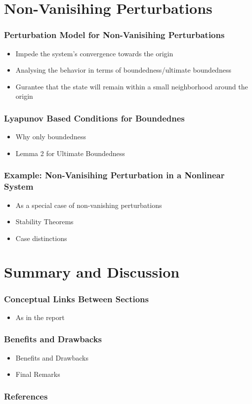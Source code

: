 \documentclass[student, noshadow, lsr, english, aspectratio=169, t]{ITR_LSR_slides}
\begin{document}
\section{Non-Vanisihing Perturbations}

\begin{frame}
	\frametitle{Perturbation Model for Non-Vanisihing Perturbations}
	\begin{itemize}
		\item Impede the system's convergence towards the origin
		\item Analysing the behavior in terms of boundedness/ultimate boundedness
		\item Gurantee that the state will remain within a small neighborhood around the origin
	\end{itemize}
\end{frame}

\begin{frame}
	\frametitle{Lyapunov Based Conditions for Boundednes}
	\begin{itemize}
		\item Why only boundedness
		\item Lemma 2 for Ultimate Boundedness
	\end{itemize}
\end{frame}

\begin{frame}
	\frametitle{Example: Non-Vanisihing Perturbation in a Nonlinear System}
	\begin{itemize}
		\item As a special case of non-vanishing perturbations
		\item Stability Theorems
		\item Case distinctions
	\end{itemize}
\end{frame}

\section{Summary and Discussion}

\begin{frame}
	\frametitle{Conceptual Links Between Sections}
	\begin{itemize}
		\item As in the report
	\end{itemize}
\end{frame}

\begin{frame}
	\frametitle{Benefits and Drawbacks}
	\begin{itemize}
		\item Benefits and Drawbacks
		\item Final Remarks
	\end{itemize}
\end{frame}


\begin{frame}[allowframebreaks]
    \frametitle{References}
    \nocite{*} 
    \printbibliography[heading=none]
\end{frame}
\end{document}
